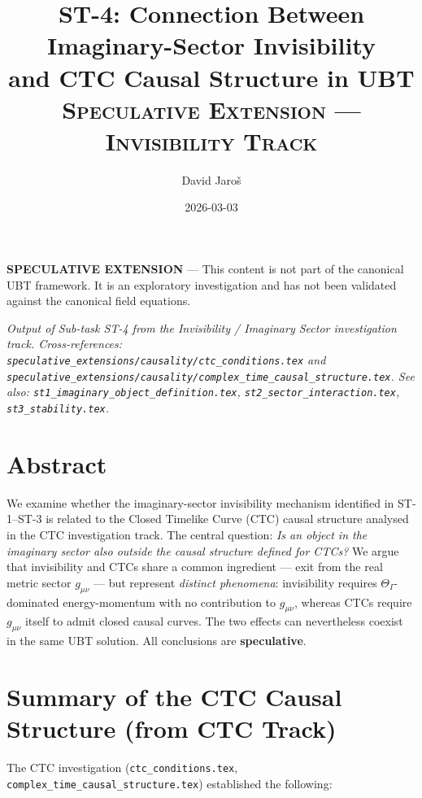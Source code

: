 \documentclass[12pt]{article}
\title{ST-4: Connection Between Imaginary-Sector Invisibility\\
and CTC Causal Structure in UBT\\[0.5em]
\large\textsc{Speculative Extension — Invisibility Track}}
\author{David Jaroš}
\date{2026-03-03}
\begin{document}
\maketitle

\begin{tcolorbox}[colback=yellow!10, title=Status]
\textbf{SPECULATIVE EXTENSION} — This content is not part of
the canonical UBT framework.  It is an exploratory investigation
and has not been validated against the canonical field equations.
\end{tcolorbox}

\vspace{1em}
\noindent\textit{Output of Sub-task ST-4 from the Invisibility / Imaginary Sector
investigation track.  Cross-references:
\texttt{speculative\_extensions/causality/ctc\_conditions.tex} and
\texttt{speculative\_extensions/causality/complex\_time\_causal\_structure.tex}.
See also:
\texttt{st1\_imaginary\_object\_definition.tex},
\texttt{st2\_sector\_interaction.tex},
\texttt{st3\_stability.tex}.}

\section*{Abstract}
We examine whether the imaginary-sector invisibility mechanism
identified in ST-1–ST-3 is related to the Closed Timelike Curve (CTC)
causal structure analysed in the CTC investigation track.
The central question: \emph{Is an object in the imaginary sector
also outside the causal structure defined for CTCs?}
We argue that invisibility and CTCs share a common ingredient —
exit from the real metric sector $g_{\mu\nu}$ — but represent
\emph{distinct phenomena}: invisibility requires $\Theta_I$-dominated
energy-momentum with no contribution to $g_{\mu\nu}$, whereas CTCs
require $g_{\mu\nu}$ itself to admit closed causal curves.
The two effects can nevertheless coexist in the same UBT solution.
All conclusions are \textbf{speculative}.

\section{Summary of the CTC Causal Structure (from CTC Track)}

The CTC investigation (\texttt{ctc\_conditions.tex},
\texttt{complex\_time\_causal\_structure.tex}) established the following:
\end{document}

